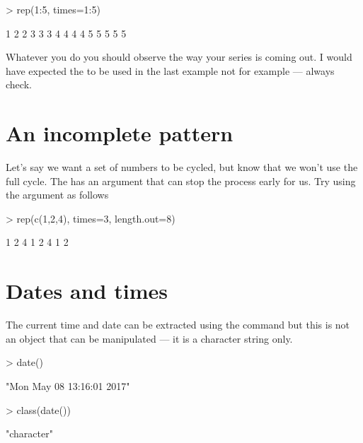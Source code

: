 \begin{Schunk}
\begin{Sinput}
> rep(1:5, times=1:5) 
\end{Sinput}
\begin{Soutput}
 [1] 1 2 2 3 3 3 4 4 4 4 5 5 5 5 5
\end{Soutput}
\end{Schunk}

Whatever you do you should observe the way your series is coming out. I would have expected the  to be used in the last example not  for example --- always check. 
 
\section{An incomplete pattern} 
 
Let's say we want a set of numbers to be cycled, but know that we won't use the full cycle. The  has an argument that can stop the process early for us. Try using the  argument as follows 

\begin{Schunk}
\begin{Sinput}
> rep(c(1,2,4), times=3, length.out=8) 
\end{Sinput}
\begin{Soutput}
[1] 1 2 4 1 2 4 1 2
\end{Soutput}
\end{Schunk}

 
 
\section{Dates and times} 
 
The current time and date can be extracted using the  command but this is not an object that can be manipulated --- it is a character string only. 

\begin{Schunk}
\begin{Sinput}
> date() 
\end{Sinput}
\begin{Soutput}
[1] "Mon May 08 13:16:01 2017"
\end{Soutput}
\begin{Sinput}
> class(date()) 
\end{Sinput}
\begin{Soutput}
[1] "character"
\end{Soutput}
\end{Schunk}


